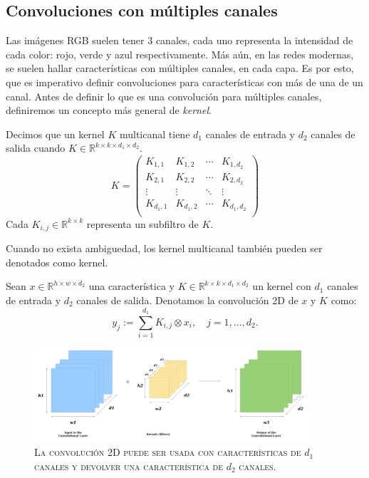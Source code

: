  \subsection{Convoluciones con múltiples canales}
 Las imágenes RGB suelen tener 3 canales, cada uno representa la intensidad de cada color: rojo, verde y azul respectivamente. Más aún, en las redes modernas, se suelen hallar características con múltiples canales, en cada capa. Es por esto, que es imperativo definir convoluciones para características con más de una de un canal.
 Antes de definir lo que es una convolución para múltiples canales, definiremos un concepto más general de \textsl{kernel}.
 \begin{definition}
    Decimos que un kernel $K$ multicanal tiene $d_1$ canales de entrada y $d_2$ canales de salida cuando $K\in \mathbb R^{k\times k\times d_1 \times d_2}$.
    $$K = \left(
        \begin{matrix}
            K_{1,1} & K_{1,2} & \cdots & K_{1,d_2} \\
            K_{2,1} & K_{2,2} & \cdots & K_{2,d_2} \\
            \vdots & \vdots & \ddots & \vdots \\
            K_{d_1,1} & K_{d_1,2} & \cdots & K_{d_1,d_2} \\
        \end{matrix}
    \right)$$  
    Cada $K_{i,j}\in \mathbb R^{k\times k}$ representa un subfiltro de $K$.
 \end{definition}
 Cuando no exista ambiguedad, los kernel multicanal también pueden ser denotados como kernel.
 \begin{definition}
    Sean $x\in \mathbb R^{h \times w \times d_2}$ una característica y $K\in \mathbb R^{k\times k \times d_1\times d_2}$ un kernel con $d_1$ canales de entrada y $d_2$ canales de salida. Denotamos la convolución 2D de $x$ y $K$ como:
    \begin{equation}
        y_j := \sum_{i=1}^{d_1} K_{i,j} \otimes x_i, \quad j = 1, ..., d_2.
    \end{equation}

 \end{definition}
 \begin{figure}[H]
    \centering
    \includegraphics[width=4in]{../cap2_CNNs/src/conv2d.png}
    \caption{\textsc{La convolución 2D puede ser usada con características de $d_1$ canales y devolver una característica de $d_2$ canales.}} 
\end{figure}
